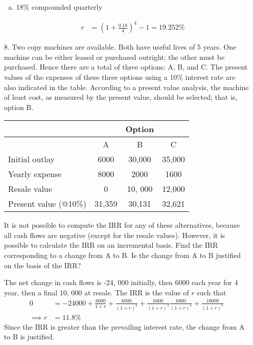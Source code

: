\documentclass{article}
\begin{document}
\begin{itemize}
\begin{enumerate}[(a)]
			\item 18\% compounded quarterly 
				\begin{answer*}
					\begin{align*}
						r &= \left( 1+\frac{0.18}{4} \right)^4 - 1 = 19.252\%
					\end{align*}
				\end{answer*}

		\end{enumerate}

	\item[8.] Two copy machines are available. Both have useful lives of 5 years. One machine can be either leased or purchased outright; the other must be purchased. Hence there are a total of three options: A, B, and C. The present values of the expenses of these three options using a 10\% interest rate are also indicated in the table. According to a present value analysis, the machine of least cost, as measured by the present value, should be selected; that is, option B.
		\begin{center}
			\begin{tabular}{lccc}
				 & & Option & \\
				 \hline
				 & A & B & C \\
				 \hline
				 Initial outlay & 6000 & 30,000 & 35,000 \\
				 Yearly expense & 8000 & 2000 & 1600 \\
				 Resale value & 0 & 10, 000 & 12,000 \\
				 Present value (@10\%) & 31,359 & 30,131 & 32,621 \\
				 \hline
			\end{tabular}
		\end{center}
		It is not possible to compute the IRR for any of these alternatives, because all cash flows are negative (except for the resale values). However, it is possible to calculate the IRR on an incremental basis. Find the IRR corresponding to a change from A to B. Is the change from A to B justified on the basis of the IRR?
		\begin{soln}
			The net change in cash flows is -24, 000 initially, then 6000 each year for 4 year, then a final 10, 000 at resale. The IRR is the value of $r$ such that
			\begin{align*}
				0 &= -24000 + \frac{6000}{1+r} + \frac{6000}{(1+r)^2}+\frac{6000}{(1+r)^3}\frac{6000}{(1+r)^4} + \frac{10000}{(1+r)^5} \\
				\implies r &= 11.8\%
			\end{align*}
			Since the IRR is greater than the prevailing interest rate, the change from A to B is justified.
		\end{soln}


\end{itemize}
\end{document}
